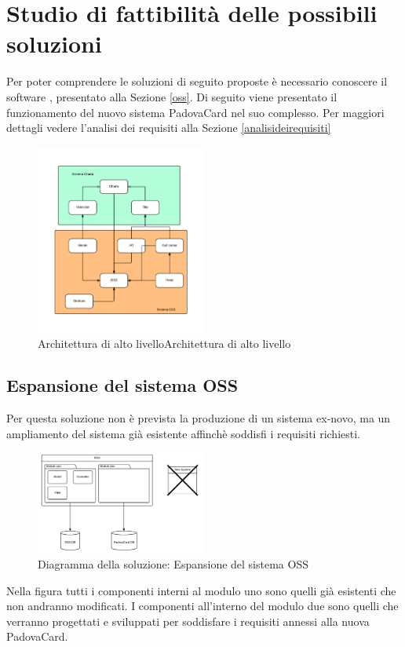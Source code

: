 \section{Studio di fattibilità delle possibili soluzioni}
Per poter comprendere le soluzioni di seguito proposte è necessario conoscere il software , presentato alla Sezione \ref{oss}.
Di seguito viene presentato il funzionamento del nuovo sistema PadovaCard nel suo complesso.
Per maggiori dettagli vedere l'analisi dei requisiti alla Sezione \ref{analisideirequisiti}
\begin{figure}[H]
\centering
\includegraphics[width=0.5\textwidth]{images/Schema_introduttivo.png}
\caption{Architettura di alto livelloArchitettura di alto livello}
\end{figure}

\subsection{Espansione del sistema OSS}
Per questa soluzione non è prevista la produzione di un sistema ex-novo, ma un ampliamento del sistema  già esistente affinchè soddisfi i requisiti richiesti.
\begin{figure}[H]
\centering
\includegraphics[width=0.5\textwidth]{images/Espansione_del_sistema_OSS.png}
\caption{Diagramma della soluzione: Espansione del sistema OSS}
\end{figure}
Nella figura tutti i componenti interni al modulo uno sono quelli già esistenti che non andranno modificati.
I componenti all'interno del modulo due sono quelli che verranno progettati e sviluppati per soddisfare i requisiti annessi alla nuova PadovaCard.\\

